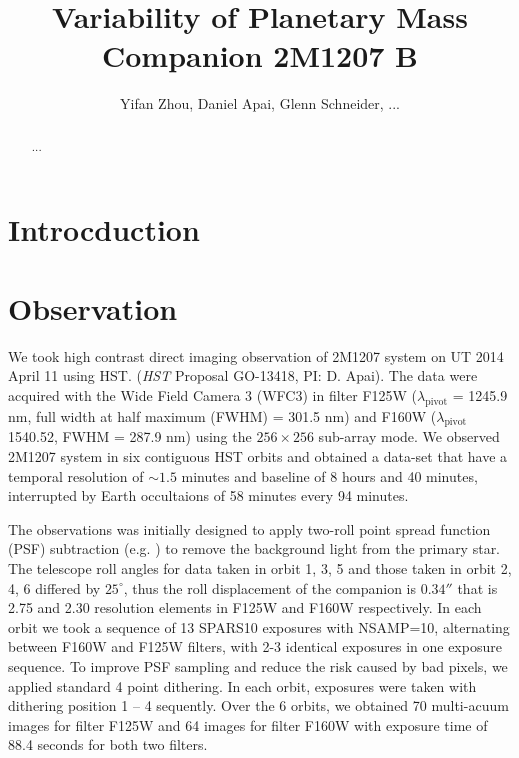 \documentclass[apj]{emulateapj}
\begin{document}
\title{Variability of Planetary Mass Companion 2M1207 B}
\author{Yifan Zhou, Daniel Apai, Glenn Schneider, ...}

\begin{abstract}
...
\end{abstract}

\maketitle
%
\section{Introcduction}

\section{Observation}
We took high contrast direct imaging observation of 2M1207 system on
UT 2014 April 11 using HST.  (\textit{HST} Proposal GO-13418, PI:
D. Apai). The data were acquired with the Wide Field Camera 3 (WFC3)
in filter F125W ($\lambda_{\mbox{pivot}}$ = 1245.9 nm, full width at
half maximum (FWHM) = 301.5
nm) and F160W ($\lambda_{\mbox{pivot}}$ 1540.52, FWHM = 287.9 nm)
using the $256\times256$ sub-array mode. We observed 2M1207 system in
six contiguous HST orbits and obtained a data-set that have a temporal
resolution of $\sim1.5$ minutes and baseline of 8 hours and 40
minutes, interrupted by Earth occultaions of 58 minutes every  94 minutes.


The observations was initially designed to apply two-roll
point spread function (PSF) subtraction (e.g. \cite{Song2006}) to remove the background light
from the primary star. The telescope roll angles for data taken in
orbit 1, 3, 5 and those taken in orbit 2, 4, 6 differed by
$25^{\circ}$, thus the roll displacement of the companion is $0.34''$
that is 2.75 and 2.30 resolution elements in F125W and F160W respectively.
In each orbit we took a sequence of 13 SPARS10 exposures with
NSAMP=10, alternating between F160W and F125W filters, with 2-3
identical exposures in one exposure sequence. To improve PSF sampling
and reduce the risk caused by bad pixels, we applied standard 4 point
dithering. In each orbit, exposures were taken with dithering position
1 -- 4 sequently. Over the 6 orbits, we obtained 70 multi-acuum images for filter
F125W and 64 images for filter F160W with exposure time of 88.4
seconds for both two filters.
\end{document}
